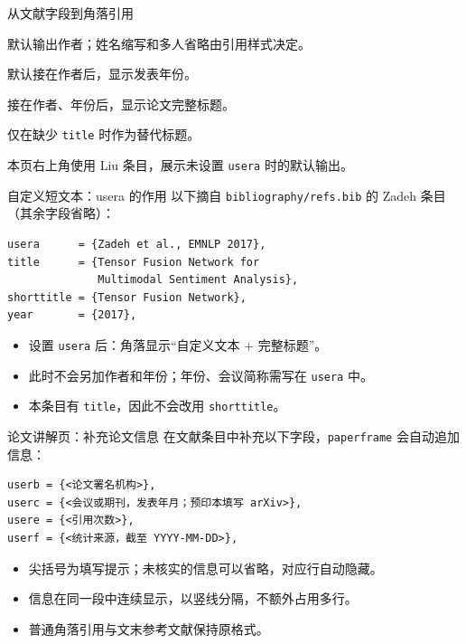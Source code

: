 \begin{frame}{从文献字段到角落引用}
  \begin{description}
    \item[\texttt{author}] 默认输出作者；姓名缩写和多人省略由引用样式决定。
    \item[\texttt{year}] 默认接在作者后，显示发表年份。
    \item[\texttt{title}] 接在作者、年份后，显示论文完整标题。
    \item[\texttt{shorttitle}] 仅在缺少 \texttt{title} 时作为替代标题。
  \end{description}
  \medskip
  本页右上角使用 Liu 条目，展示未设置 \texttt{usera} 时的默认输出。
\end{frame}

\begin{frame}[fragile]{自定义短文本：usera 的作用}
  以下摘自 \texttt{bibliography/refs.bib} 的 Zadeh 条目（其余字段省略）：
  \begin{verbatim}
usera      = {Zadeh et al., EMNLP 2017},
title      = {Tensor Fusion Network for
              Multimodal Sentiment Analysis},
shorttitle = {Tensor Fusion Network},
year       = {2017},
  \end{verbatim}
  \begin{itemize}
    \item 设置 \texttt{usera} 后：角落显示“自定义文本 + 完整标题”。
    \item 此时不会另加作者和年份；年份、会议简称需写在 \texttt{usera} 中。
    \item 本条目有 \texttt{title}，因此不会改用 \texttt{shorttitle}。
  \end{itemize}
\end{frame}

\begin{frame}[fragile]{论文讲解页：补充论文信息}
  在文献条目中补充以下字段，\texttt{paperframe} 会自动追加信息：
  \begin{verbatim}
userb = {<论文署名机构>},
userc = {<会议或期刊，发表年月；预印本填写 arXiv>},
usere = {<引用次数>},
userf = {<统计来源，截至 YYYY-MM-DD>},
  \end{verbatim}
  \begin{itemize}
    \item 尖括号为填写提示；未核实的信息可以省略，对应行自动隐藏。
    \item 信息在同一段中连续显示，以竖线分隔，不额外占用多行。
    \item 普通角落引用与文末参考文献保持原格式。
  \end{itemize}
\end{frame}

